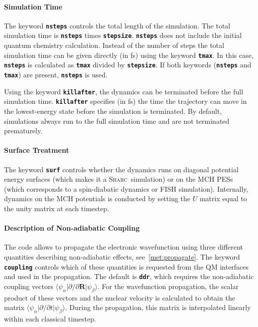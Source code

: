 \documentclass[a4paper,11pt,DIV=15,openany,twoside=false]{scrbook}
\newcommand{\sharc}{\textsc{Sharc}}
\newcommand{\ttt}[1]{\textbf{\texttt{#1}}}
\newcommand{\VEC}[1]{\ensuremath{\mathbf{#1}}}
\begin{document}
\paragraph{Simulation Time}

The keyword \ttt{nsteps} controls the total length of the simulation. The total simulation time is \ttt{nsteps} times \ttt{stepsize}. \ttt{nsteps} does not include the initial quantum chemistry calculation. Instead of the number of steps the total simulation time can be given directly (in fs) using the keyword \ttt{tmax}. In this case, \ttt{nsteps} is calculated as \ttt{tmax} divided by \ttt{stepsize}. If both keywords (\ttt{nsteps} and \ttt{tmax}) are present, \ttt{nsteps} is used.

Using the keyword \ttt{killafter}, the dynamics can be terminated before the full simulation time. \ttt{killafter} specifies (in fs) the time the trajectory can move in the lowest-energy state before the simulation is terminated. By default, simulations always run to the full simulation time and are not terminated prematurely.

\paragraph{Surface Treatment}

The keyword \ttt{surf} controls whether the dynamics runs on diagonal potential energy surfaces (which makes it a \sharc\ simulation) or on the MCH PESs (which corresponds to a spin-diabatic dynamics \cite{Granucci2012JCP} or FISH \cite{Mitric2009PRA} simulation). Internally, dynamics on the MCH potentials is conducted by setting the $U$ matrix equal to the unity matrix at each timestep. 

\paragraph{Description of Non-adiabatic Coupling}

The code allows to propagate the electronic wavefunction using three different quantities describing non-adiabatic effects, see~\ref{met:propagate}. The keyword \ttt{coupling} controls which of these quantities is requested from the QM interfaces and used in the propagation. The default is \ttt{ddr}, which requires the non-adiabatic coupling vectors $\langle\psi_\alpha|\partial/\partial \VEC{R}|\psi_\beta\rangle$. For the wavefunction propagation, the scalar product of these vectors and the nuclear velocity is calculated to obtain the matrix $\langle\psi_\alpha|\partial/\partial t|\psi_\beta\rangle$. During the propagation, this matrix is interpolated linearly within each classical timestep.
\end{document}
